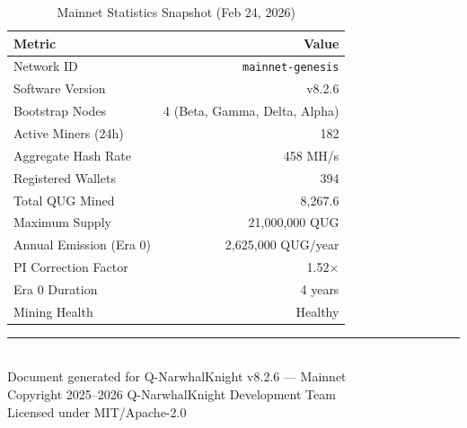 \documentclass[11pt,a4paper]{article}
\begin{document}
\begin{table}[H]
\centering
\begin{tabular}{lr}
\toprule
\textbf{Metric} & \textbf{Value} \\
\midrule
Network ID & \texttt{mainnet-genesis} \\
Software Version & v8.2.6 \\
Bootstrap Nodes & 4 (Beta, Gamma, Delta, Alpha) \\
Active Miners (24h) & 182 \\
Aggregate Hash Rate & 458 MH/s \\
Registered Wallets & 394 \\
Total QUG Mined & 8,267.6 \\
Maximum Supply & 21,000,000 QUG \\
Annual Emission (Era 0) & 2,625,000 QUG/year \\
PI Correction Factor & 1.52$\times$ \\
Era 0 Duration & 4 years \\
Mining Health & Healthy \\
\bottomrule
\end{tabular}
\caption{Mainnet Statistics Snapshot (Feb 24, 2026)}
\end{table}

\vfill

\begin{center}
\rule{0.5\textwidth}{0.4pt}\\[0.5cm]
{\small Document generated for Q-NarwhalKnight v8.2.6 --- Mainnet}\\
{\small Copyright 2025--2026 Q-NarwhalKnight Development Team}\\
{\small Licensed under MIT/Apache-2.0}
\end{center}
\end{document}
